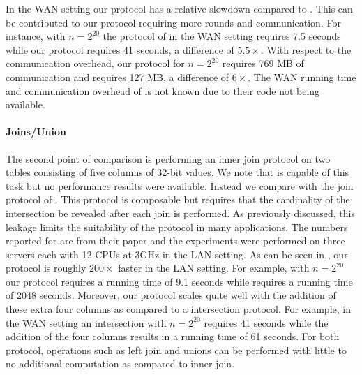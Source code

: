 In the WAN setting our protocol has a relative slowdown compared to \cite{CCS:KKRT16}. This can be contributed to our protocol requiring more rounds and communication. For instance, with $n=2^{20}$ the protocol of \cite{CCS:KKRT16} in the WAN setting requires 7.5 seconds while our protocol requires 41 seconds, a difference of $5.5\times$. With respect to the communication overhead, our protocol for $n=2^{20}$ requires 769 MB of communication and \cite{CCS:KKRT16} requires 127 MB, a difference of $6\times$. The WAN running time and communication overhead of \cite{ASIACCS:BlaAgu12} is not known due to their code not being available.


\paragraph{Joins/Union} 
The second point of comparison is performing an inner join protocol on two tables consisting of five columns of 32-bit values. We note that \cite{ASIACCS:BlaAgu12} is capable of this task but no performance results were available. Instead we compare with the join protocol of \cite{LTW13}. This protocol is composable but requires that the cardinality of the intersection be revealed after each join is performed. As previously discussed, this leakage limits the suitability of the protocol in many applications. The numbers reported for \cite{LTW13} are from their paper and the experiments were performed on three servers each with 12 CPUs at 3GHz in the LAN setting. As can be seen in , our protocol is roughly $200\times$ faster in the LAN setting. For example, with $n=2^{20}$ our protocol requires a running time of 9.1 seconds while \cite{LTW13} requires a running time of 2048 seconds. Moreover, our protocol scales quite well with the addition of these extra four columns as compared to a intersection protocol. For example, in the WAN setting an intersection with $n=2^{20}$ requires 41 seconds while the addition of the four columns results in a  running time of 61 seconds. For both protocol, operations such as left join and unions can be performed with little to no additional computation as compared to inner join.

